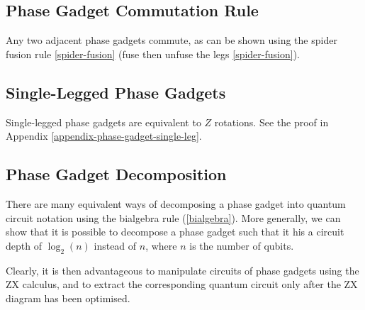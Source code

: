 

\subsection{Phase Gadget Commutation Rule}%
\label{phase-gadget-commutation}

Any two adjacent phase gadgets commute, as can be shown using the spider fusion rule \ref{spider-fusion} (fuse then unfuse the legs \ref{spider-fusion}).



\subsection{Single-Legged Phase Gadgets}%
\label{phase-gadget-single-leg}

Single-legged phase gadgets are equivalent to $Z$ rotations. See the proof in Appendix \ref{appendix-phase-gadget-single-leg}.



\subsection{Phase Gadget Decomposition}%
\label{phase-gadget-decomposition}

There are many equivalent ways of decomposing a phase gadget into quantum circuit notation using the bialgebra rule (\ref{bialgebra}). More generally, we can show that it is possible to decompose a phase gadget such that it his a circuit depth of $\log_2(n)$ instead of $n$, where $n$ is the number of qubits.


Clearly, it is then advantageous to manipulate circuits of phase gadgets using the ZX calculus, and to extract the corresponding quantum circuit only after the ZX diagram has been optimised.
